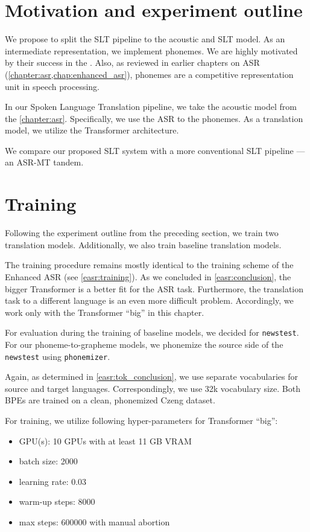 \section{Motivation and experiment outline}
\label{slt:outline}
We propose to split the SLT pipeline to the acoustic and SLT model. As an intermediate representation, we implement phonemes. We are highly motivated by their success in the . Also, as reviewed in earlier chapters on ASR (\cref{chapter:asr,chap:enhanced_asr}), phonemes are a competitive representation unit in speech processing.  

In our Spoken Language Translation pipeline, we take the acoustic model from the \cref{chapter:asr}. Specifically, we use the ASR to the phonemes. As a translation model, we utilize the Transformer architecture.

We compare our proposed SLT system with a more conventional SLT pipeline --- an ASR-MT tandem.

\section{Training}
\label{slt:training}
Following the experiment outline from the preceding section, we train two translation models. Additionally, we also train baseline translation models. 

The training procedure remains mostly identical to the training scheme of the Enhanced ASR (see \cref{easr:training}). As we concluded in \cref{easr:conclusion}, the bigger Transformer is a better fit for the ASR task. Furthermore, the translation task to a different language is an even more difficult problem. Accordingly, we work only with the Transformer ``big'' in this chapter.

For evaluation during the training of baseline models, we decided for \texttt{news\-test}. For our phoneme-to-grapheme models, we phonemize the source side of the \texttt{news\-test} using \texttt{phonemizer}.

Again, as determined in \cref{easr:tok_conclusion}, we use separate vocabularies for source and target languages. Correspondingly, we use 32k vocabulary size. Both BPEs are trained on a clean, phonemized Czeng dataset.

For training, we utilize following hyper-parameters for Transformer ``big'':
\begin{itemize}
	\item GPU(s): 10 GPUs with at least 11 GB VRAM
	\item batch size: 2000
	\item learning rate: 0.03
	\item warm-up steps: 8000
	\item max steps: 600000 with manual abortion
\end{itemize}

